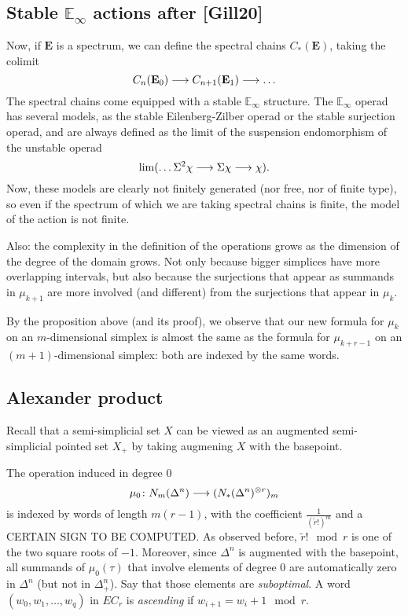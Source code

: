 \subsection{Stable $\mathbb{E}_\infty$ actions after [Gill20]}

Now, if $\mathbf{E}$ is a spectrum, we can define the spectral chains $C_*(\mathbf{E})$, taking the colimit
\[C_n(\mathbf{E}_0)\longrightarrow C_{n+1}(\mathbf{E}_1)\longrightarrow \ldots\]
The spectral chains come equipped with a stable $\mathbb{E}_\infty$ structure. The $\mathbb{E}_\infty$ operad has several models, as the stable Eilenberg-Zilber operad or the stable surjection operad, and are always defined as the limit of the suspension endomorphism of the unstable operad
\[\lim(\ldots \Sigma^2 \chi \longrightarrow \Sigma \chi\longrightarrow \chi).\]
Now, these models are clearly not finitely generated (nor free, nor of finite type), so even if the spectrum of which we are taking spectral chains is finite, the model of the action is not finite.

Also: the complexity in the definition of the operations grows as the dimension of the degree of the domain grows. Not only because bigger simplices have more overlapping intervals, but also because the surjections that appear as summands in $\mu_{k+1}$ are more involved (and different) from the surjections that appear in $\mu_k$.

By the proposition above (and its proof), we observe that our new formula for $\mu_k$ on an $m$-dimensional simplex is almost the same as the formula for $\mu_{k+r-1}$ on an $(m+1)$-dimensional simplex: both are indexed by the same words.

\subsection{Alexander product}

Recall that a semi-simplicial set $X$ can be viewed as an augmented semi-simplicial pointed set $X_+$ by taking augmening $X$ with the basepoint.

The operation induced in degree $0$
\[\mu_0\colon N_m(\Delta^n)\longrightarrow (N_*(\Delta^n)^{\otimes r})_m\]
is indexed by words of length $m(r-1)$, with the coefficient $\frac{1}{(\tilde{r}!)^m}$ and a CERTAIN SIGN TO BE COMPUTED. As observed before, $\tilde{r}!\mod r$ is one of the two square roots of $-1$. Moreover, since $\Delta^n$ is augmented with the basepoint, all summands of $\mu_0(\tau)$ that involve elements of degree $0$ are automatically zero in $\Delta^n$ (but not in $\Delta^n_+$). Say that those elements are \emph{suboptimal}. A word $(w_0,w_1,\ldots,w_q)$ in $EC_r$ is \emph{ascending} if $w_{i+1} = w_i+1\mod r$.

